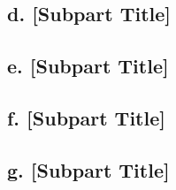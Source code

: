 \documentclass[11pt]{article}
\begin{document}
\subsection*{d. [Subpart Title]}

\subsection*{e. [Subpart Title]}

\subsection*{f. [Subpart Title]}

\subsection*{g. [Subpart Title]}
\end{document}
